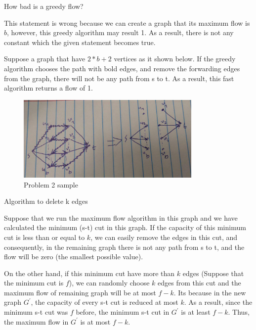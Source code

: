 \documentclass[12pt]{article}
\newenvironment{solution}[2][Solution]{\begin{trivlist}
\item[\hskip \labelsep {\bfseries #1}]}{\end{trivlist}}
\newenvironment{problem}[2][Problem]{\begin{trivlist}
\item[\hskip \labelsep {\bfseries #1}\hskip \labelsep {\bfseries #2.}]}{\end{trivlist}}
\begin{document}
\begin{problem}{2}
How bad is a greedy flow?
\end{problem}

\begin{solution}{}
This statement is wrong because we can create a graph that its maximum flow
is $b$, however, this greedy algorithm may result 1. As a result, there is 
not any constant which the given statement becomes true.

Suppose a graph that have $2*b+2$ vertices as it shown below. If the greedy 
algorithm chooses the path with bold edges, and remove the forwarding edges
from the graph, there will not be any path from s to t. As a result, this 
fast algorithm returns a flow of 1.
\begin{figure}[H]
 \centering
 \includegraphics[width=0.80\textwidth]{q2.jpg}
 \caption{Problem 2 sample
 \label{fig:2a}}
\end{figure}
\end{solution}


\begin{problem}{3}
Algorithm to delete k edges
\end{problem}

\begin{solution}{}
Suppose that we run the maximum flow algorithm in this graph and we have 
calculated the minimum (s-t) cut in this graph. If the capacity of this 
minimum cut is less than or equal to $k$, we can easily remove the edges
in this cut, and consequently, in the remaining graph there is not any
path from s to t, and the flow will be zero (the smallest possible value).

On the other hand, if this minimum cut have more than $k$ edges (Suppose
that the minimum cut is $f$), we can randomly choose $k$ edges from this
cut and the maximum flow of remaining graph will be at most $f-k$. Its 
because in the new graph $G^\prime$, the capacity of every s-t cut is
reduced at most $k$. As a result, since the minimum s-t cut was $f$ before,
the minimum s-t cut in $G^\prime$ is at least $f-k$. Thus, the maximum
flow in $G^\prime$ is at most $f-k$.
\end{solution}
\end{document}
